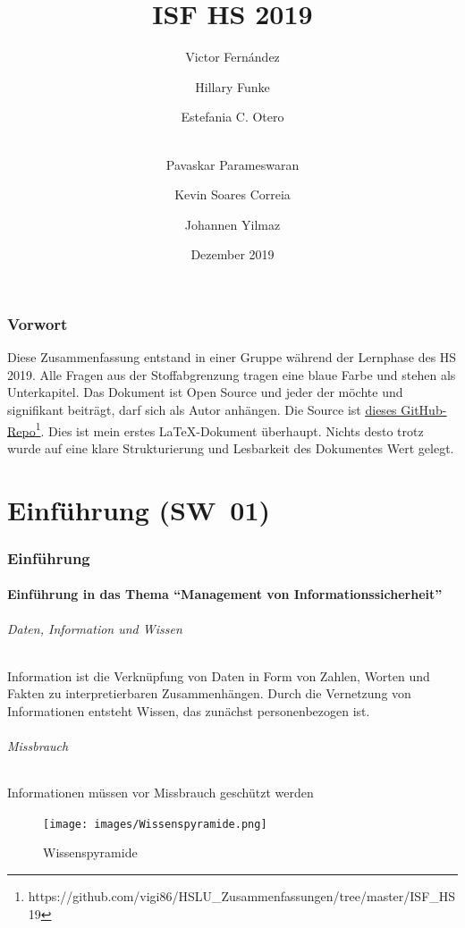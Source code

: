 \documentclass[10pt,a4paper]{article}
\title{ISF HS 2019}
\author[1]{Victor Fernández}
\author[2]{Hillary Funke}
\author[2]{Estefania C. Otero}
\author[3]{\\Pavaskar Parameswaran}
\author[3]{Kevin Soares Correia}
\author[2]{Johannen Yilmaz}
\affil[1]{HSLU Informatik}
\affil[2]{HSLU Information and Cybersecurity}
\affil[3]{HSLU Wirtschaftsinformatik}
\date{Dezember 2019}
\begin{document}
\maketitle
\thispagestyle{empty}
\section*{Vorwort}Diese Zusammenfassung entstand in einer Gruppe während der Lernphase des HS 2019. Alle Fragen aus der Stoffabgrenzung tragen eine {\color{dunkelblau}blaue Farbe} und stehen als Unterkapitel. Das Dokument ist Open Source und jeder der möchte und signifikant beiträgt, darf sich als Autor anhängen. Die Source ist \underline{\href{https://github.com/vigi86/HSLU_Zusammenfassungen/tree/master/ISF_HS19}{dieses GitHub-Repo}}\footnote{https://github.com/vigi86/HSLU\_Zusammenfassungen/tree/master/ISF\_HS19}. Dies ist mein erstes \LaTeX{}-Dokument überhaupt. Nichts desto trotz wurde auf eine klare Strukturierung und Lesbarkeit des Dokumentes Wert gelegt.
\tableofcontents
\thispagestyle{empty}
\pagebreak


\part{Einführung (SW~01)}

\section{Einführung}

\subsection*{Einführung in das Thema "`Management von Informationssicherheit"'}

\paragraph*{Daten, Information und Wissen}Information ist die Verknüpfung von Daten in Form von Zahlen, Worten und Fakten zu interpretierbaren Zusammenhängen. Durch die Vernetzung von Informationen entsteht Wissen, das zunächst personenbezogen ist.

\paragraph*{Missbrauch}Informationen müssen vor Missbrauch geschützt werden
\begin{figure}[H]
    \begin{center}
    \texttt{[image: images/Wissenspyramide.png]}
    \caption{Wissenspyramide\cite{wiki}}
    \label{Wissenspyramide}
    \end{center}
\end{figure}
\end{document}
